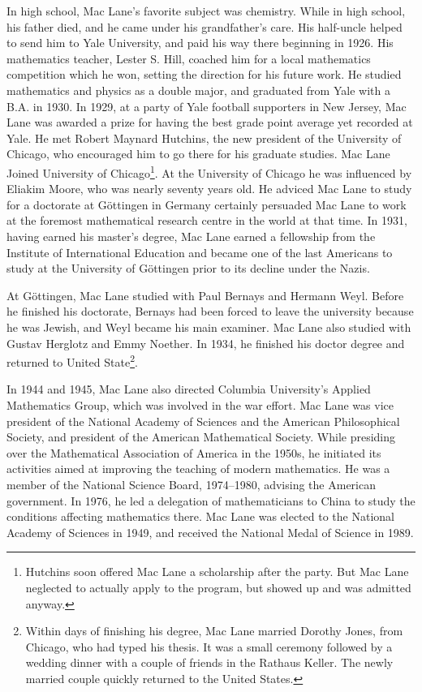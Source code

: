 \documentclass{article}
\begin{document}
In high school, Mac Lane's favorite subject was chemistry. While in high school, his father died, and he came under his grandfather's care. His half-uncle helped to send him to Yale University, and paid his way there beginning in 1926. His mathematics teacher, Lester S. Hill, coached him for a local mathematics competition which he won, setting the direction for his future work. He studied mathematics and physics as a double major, and graduated from Yale with a B.A. in 1930. In 1929, at a party of Yale football supporters in New Jersey, Mac Lane was awarded a prize for having the best grade point average yet recorded at Yale. He met Robert Maynard Hutchins, the new president of the University of Chicago, who encouraged him to go there for his graduate studies\cite{Wiki-Mac-Lane}. Mac Lane Joined University of Chicago\footnote{Hutchins soon offered Mac Lane a scholarship after the party. But Mac Lane neglected to actually apply to the program, but showed up and was admitted anyway.}. At the University of Chicago he was influenced by Eliakim Moore, who was nearly seventy years old. He adviced Mac Lane to study for a doctorate at Göttingen in Germany certainly persuaded Mac Lane to work at the foremost mathematical research centre in the world at that time. In 1931, having earned his master's degree, Mac Lane earned a fellowship from the Institute of International Education and became one of the last Americans to study at the University of Göttingen prior to its decline under the Nazis.

At Göttingen, Mac Lane studied with Paul Bernays and Hermann Weyl. Before he finished his doctorate, Bernays had been forced to leave the university because he was Jewish, and Weyl became his main examiner. Mac Lane also studied with Gustav Herglotz and Emmy Noether. In 1934, he finished his doctor degree and returned to United State\footnote{Within days of finishing his degree, Mac Lane married Dorothy Jones, from Chicago, who had typed his thesis. It was a small ceremony followed by a wedding dinner with a couple of friends in the Rathaus Keller. The newly married couple quickly returned to the United States.}.

In 1944 and 1945, Mac Lane also directed Columbia University's Applied Mathematics Group, which was involved in the war effort. Mac Lane was vice president of the National Academy of Sciences and the American Philosophical Society, and president of the American Mathematical Society. While presiding over the Mathematical Association of America in the 1950s, he initiated its activities aimed at improving the teaching of modern mathematics. He was a member of the National Science Board, 1974–1980, advising the American government. In 1976, he led a delegation of mathematicians to China to study the conditions affecting mathematics there. Mac Lane was elected to the National Academy of Sciences in 1949, and received the National Medal of Science in 1989.
\end{document}
